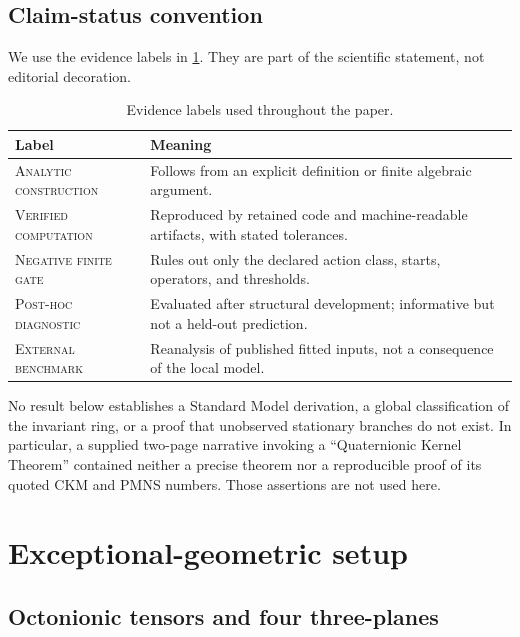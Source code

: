 \documentclass[11pt]{article}
\newcommand{\status}[1]{\textsc{#1}}
\begin{document}
\subsection{Claim-status convention}

We use the evidence labels in \cref{tab:status}.  They are part of the scientific statement, not editorial decoration.

\begin{table}[t]
\centering
\caption{Evidence labels used throughout the paper.}
\label{tab:status}
\begin{tabularx}{\textwidth}{@{}>{\raggedright\arraybackslash}p{}X@{}}
\toprule
Label & Meaning \\
\midrule
\status{Analytic construction} & Follows from an explicit definition or finite algebraic argument. \\
\status{Verified computation} & Reproduced by retained code and machine-readable artifacts, with stated tolerances. \\
\status{Negative finite gate} & Rules out only the declared action class, starts, operators, and thresholds. \\
\status{Post-hoc diagnostic} & Evaluated after structural development; informative but not a held-out prediction. \\
\status{External benchmark} & Reanalysis of published fitted inputs, not a consequence of the local model. \\
\bottomrule
\end{tabularx}
\end{table}

No result below establishes a Standard Model derivation, a global classification of the invariant ring, or a proof that unobserved stationary branches do not exist.  In particular, a supplied two-page narrative invoking a ``Quaternionic Kernel Theorem'' contained neither a precise theorem nor a reproducible proof of its quoted CKM and PMNS numbers.  Those assertions are not used here.

\section{Exceptional-geometric setup}
\label{sec:setup}

\subsection{Octonionic tensors and four three-planes}
\end{document}
